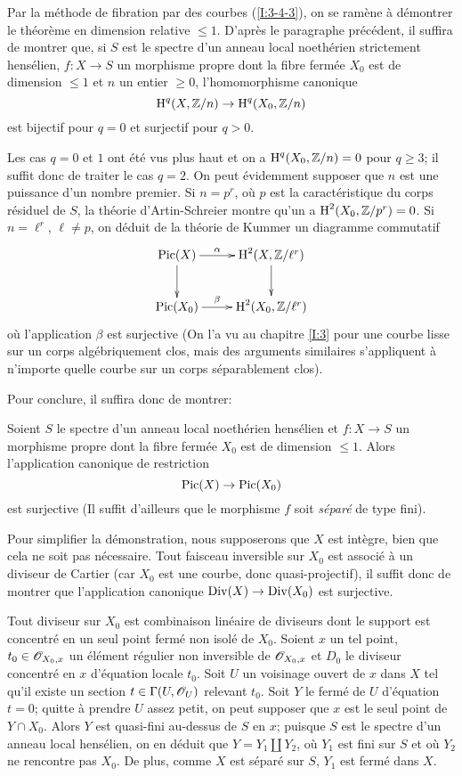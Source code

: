 \documentclass[oneside]{book}
\begin{document}
Par la méthode de fibration par des courbes (\ref{I:3-4-3}), on se ramène 
à démontrer le théorème en dimension relative $\leqslant 1$. D'après 
le paragraphe précédent, il suffira de montrer que, si $S$ est le spectre 
d'un anneau local noethérien strictement hensélien, $f:X\to S$ un 
morphisme propre dont la fibre fermée $X_0$ est de dimension $\leqslant 1$ 
et $n$ un entier $\geqslant 0$, l'homomorphisme canonique 
\[
  \operatorname{H}^q(X,\mathbb{Z}/n) \to \operatorname{H}^q(X_0,\mathbb{Z}/n)
\]
est bijectif pour $q=0$ et surjectif pour $q>0$. 

Les cas $q=0$ et $1$ ont été vus plus haut et on a $\operatorname{H}^q(X_0,\mathbb{Z}/n) = 0$ 
pour $q\geqslant 3$; il suffit donc de traiter le cas $q=2$. On peut 
évidemment supposer que $n$ est une puissance d'un nombre premier. Si 
$n=p^r$, où $p$ est la caractéristique du corps résiduel de $S$, la 
théorie d'Artin-Schreier montre qu'un a $\operatorname{H}^2(X_0,\mathbb{Z}/p^r) = 0$. Si 
$n=\ell^r$, $\ell\ne p$, on déduit de la théorie de Kummer un diagramme 
commutatif 
\[\xymatrix{
  \pic(X) \ar[d] \ar[r]^-\alpha 
    & \h^2(X,\dZ/\ell^r) \ar[d] \\
  \pic(X_0) \ar[r]^-\beta 
    & \h^2(X_0,\dZ/\ell^r)
}\]
où l'application $\beta$ est surjective (On l'a vu au chapitre \ref{I:3} pour 
une courbe lisse sur un corps algébriquement clos, mais des arguments 
similaires s'appliquent à n'importe quelle courbe sur un corps 
séparablement clos). 

Pour conclure, il suffira donc de montrer:





\begin{proposition}\label{I:4-4-1}
Soient $S$ le spectre d'un anneau local noethérien hensélien et $f:X\to S$ 
un morphisme propre dont la fibre fermée $X_0$ est de dimension 
$\leqslant 1$. Alors l'application canonique de restriction 
\[
  \operatorname{Pic}(X)\to \operatorname{Pic}(X_0)
\]
est surjective (Il suffit d'ailleurs que le morphisme $f$ soit 
\emph{séparé} de type fini). 
\end{proposition}

Pour simplifier la démonstration, nous supposerons que $X$ est intègre, 
bien que cela ne soit pas nécessaire. Tout faisceau inversible sur $X_0$ est 
associé à un diviseur de Cartier (car $X_0$ est une courbe, donc 
quasi-projectif), il suffit donc de montrer que l'application canonique 
$\operatorname{Div}(X)\to\operatorname{Div}(X_0)$ est surjective. 

Tout diviseur sur $X_0$ est combinaison linéaire de diviseurs dont le 
support est concentré en un seul point fermé non isolé de $X_0$. Soient 
$x$ un tel point, $t_0\in\mathscr{O}_{X_0,x}$ un élément régulier non inversible 
de $\mathscr{O}_{X_0,x}$ et $D_0$ le diviseur concentré en $x$ d'équation locale 
$t_0$. Soit $U$ un voisinage ouvert de $x$ dans $X$ tel qu'il existe un section 
$t\in \Gamma(U,\mathscr{O}_U)$ relevant $t_0$. Soit $Y$ le fermé de $U$ d'équation 
$t=0$; quitte à prendre $U$ assez petit, on peut supposer que $x$ est le 
seul point de $Y\cap X_0$. Alors $Y$ est quasi-fini au-dessus de $S$ en $x$; 
puisque $S$ est le spectre d'un anneau local hensélien, on en déduit que 
$Y=Y_1\amalg Y_2$, où $Y_1$ est fini sur $S$ et où $Y_2$ ne rencontre pas 
$X_0$. De plus, comme $X$ est séparé sur $S$, $Y_1$ est fermé dans $X$. 
\end{document}
